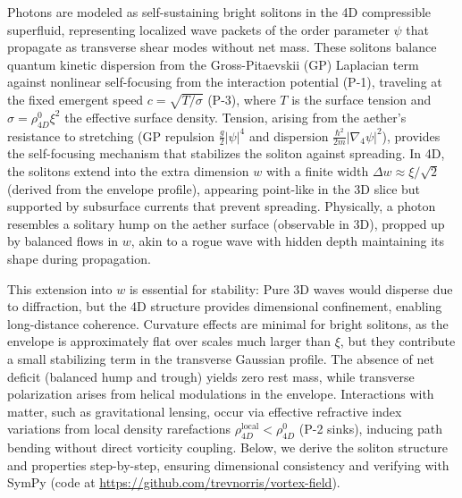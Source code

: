 Photons are modeled as self-sustaining bright solitons in the 4D compressible superfluid, representing localized wave packets of the order parameter $\psi$ that propagate as transverse shear modes without net mass. These solitons balance quantum kinetic dispersion from the Gross-Pitaevskii (GP) Laplacian term against nonlinear self-focusing from the interaction potential (P-1), traveling at the fixed emergent speed $c = \sqrt{T / \sigma}$ (P-3), where $T$ is the surface tension and $\sigma = \rho_{4D}^0 \xi^2$ the effective surface density. Tension, arising from the aether's resistance to stretching (GP repulsion $\frac{g}{2} |\psi|^4$ and dispersion $\frac{\hbar^2}{2m} |\nabla_4 \psi|^2$), provides the self-focusing mechanism that stabilizes the soliton against spreading. In 4D, the solitons extend into the extra dimension $w$ with a finite width $\Delta w \approx \xi / \sqrt{2}$ (derived from the envelope profile), appearing point-like in the 3D slice but supported by subsurface currents that prevent spreading. Physically, a photon resembles a solitary hump on the aether surface (observable in 3D), propped up by balanced flows in $w$, akin to a rogue wave with hidden depth maintaining its shape during propagation.

This extension into $w$ is essential for stability: Pure 3D waves would disperse due to diffraction, but the 4D structure provides dimensional confinement, enabling long-distance coherence. Curvature effects are minimal for bright solitons, as the envelope is approximately flat over scales much larger than $\xi$, but they contribute a small stabilizing term in the transverse Gaussian profile. The absence of net deficit (balanced hump and trough) yields zero rest mass, while transverse polarization arises from helical modulations in the envelope. Interactions with matter, such as gravitational lensing, occur via effective refractive index variations from local density rarefactions $\rho_{4D}^{\text{local}} < \rho_{4D}^0$ (P-2 sinks), inducing path bending without direct vorticity coupling. Below, we derive the soliton structure and properties step-by-step, ensuring dimensional consistency and verifying with SymPy (code at \url{https://github.com/trevnorris/vortex-field}).

